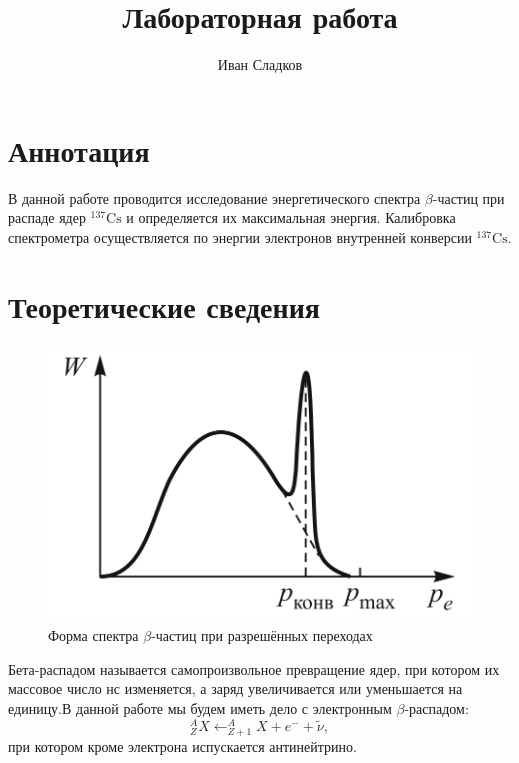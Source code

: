 \documentclass[a4paper]{article}
\title{Лабораторная работа \labnum \space \labname}
\author{Иван Сладков}
\newcommand{\isotope}[2]{$ ^{#2}\mathrm{#1} $}
\newcommand{\btt}{$\beta $}
\begin{document}
	\maketitle
	\thispagestyle{empty}
	\section{Аннотация}
	В данной работе проводится исследование энергетического	спектра \btt-частиц при распаде ядер \isotope{Cs}{137} и определяется их максимальная энергия. Калибровка спектрометра осуществляется по энергии электронов внутренней конверсии \isotope{Cs}{137}.
	
	\section{Теоретические сведения}
	
	\begin{figure}
		\includegraphics[width=1.0\linewidth]{Screenshot_1}
		\caption{Форма спектра \btt-частиц при разрешённых переходах}
		\label{fig:screenshot1}
	\end{figure}
	
	Бета-распадом называется самопроизвольное превращение ядер,	при котором их массовое число нс изменяется, а заряд увеличивается или уменьшается на единицу.В данной работе мы будем иметь дело с электронным \btt-распадом:
	\begin{equation*}
		^A_Z X \leftarrow ^A_{Z+1} X+e^-+\widetilde{\nu},
	\end{equation*}
	при котором кроме электрона испускается антинейтрино. 
	
\end{document}
